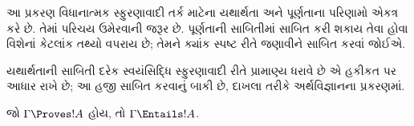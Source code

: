 \label{guunit:OLP-0503}


\begin{editorial}
  આ પ્રકરણ વિધાનાત્મક સ્ફુરણાવાદી તર્ક માટેના યથાર્થતા
  અને પૂર્ણતાના પરિણામો એકત્ર કરે છે. તેમાં પરિચય ઉમેરવાની
  જરૂર છે. પૂર્ણતાની સાબિતીમાં સાબિત કરી શકાય તેવા હોવા
  વિશેનાં કેટલાંક તથ્યો વપરાય છે; તેમને ક્યાંક સ્પષ્ટ રીતે
  જણાવીને સાબિત કરવાં જોઈએ.
\end{editorial}

\begingroup
\makeatletter{}\makeatother


\label{guunit:OLP-0504}


\begin{editorial}
  યથાર્થતાની સાબિતી દરેક સ્વયંસિદ્ધિ સ્ફુરણાવાદી રીતે
  પ્રામાણ્ય ધરાવે છે એ હકીકત પર આધાર રાખે છે; આ હજી
  સાબિત કરવાનું બાકી છે, દાખલા તરીકે અર્થવિજ્ઞાનના પ્રકરણમાં.
\end{editorial}

\begin{thm}[યથાર્થતા]
  જો $\Gamma \Proves !A$ હોય, તો $ \Gamma \Entails !A$.
\end{thm}


